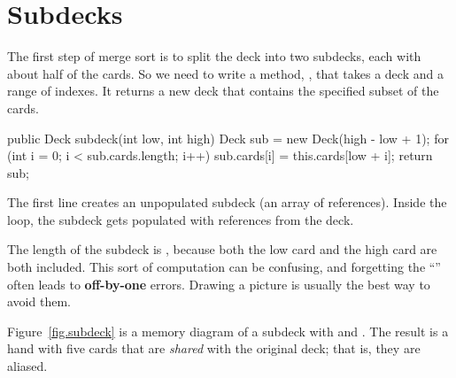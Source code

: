 \section{Subdecks}


The first step of merge sort is to split the deck into two subdecks, each with about half of the cards.
So we need to write a method, , that takes a deck and a range of indexes.
It returns a new deck that contains the specified subset of the cards.

\begin{code}
public Deck subdeck(int low, int high) {
    Deck sub = new Deck(high - low + 1);
    for (int i = 0; i < sub.cards.length; i++) {
        sub.cards[i] = this.cards[low + i];
    }
    return sub;
}
\end{code}

The first line creates an unpopulated subdeck (an array of  references).
Inside the  loop, the subdeck gets populated with references from the deck.


The length of the subdeck is , because both the low card and the high card are both included.
This sort of computation can be confusing, and forgetting the ``'' often leads to {\bf off-by-one} errors.
Drawing a picture is usually the best way to avoid them.

%


Figure~\ref{fig.subdeck} is a memory diagram of a subdeck with  and .
The result is a hand with five cards that are {\em shared} with the original deck; that is, they are aliased.

